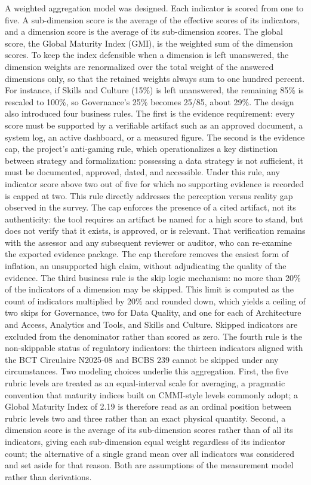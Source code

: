 A weighted aggregation model was designed. Each indicator is scored from one to five. A sub-dimension score is the average of the effective scores of its indicators, and a dimension score is the average of its sub-dimension scores. The global score, the Global Maturity Index (GMI), is the weighted sum of the dimension scores. To keep the index defensible when a dimension is left unanswered, the dimension weights are renormalized over the total weight of the answered dimensions only, so that the retained weights always sum to one hundred percent. For instance, if Skills and Culture (15\%) is left unanswered, the remaining 85\% is rescaled to 100\%, so Governance's 25\% becomes 25/85, about 29\%. The design also introduced four business rules. The first is the evidence requirement: every score must be supported by a verifiable artifact such as an approved document, a system log, an active dashboard, or a measured figure. The second is the evidence cap, the project's anti-gaming rule, which operationalizes a key distinction between strategy and formalization: possessing a data strategy is not sufficient, it must be documented, approved, dated, and accessible. Under this rule, any indicator score above two out of five for which no supporting evidence is recorded is capped at two. This rule directly addresses the perception versus reality gap observed in the survey. The cap enforces the presence of a cited artifact, not its authenticity: the tool requires an artifact be named for a high score to stand, but does not verify that it exists, is approved, or is relevant. That verification remains with the assessor and any subsequent reviewer or auditor, who can re-examine the exported evidence package. The cap therefore removes the easiest form of inflation, an unsupported high claim, without adjudicating the quality of the evidence. The third business rule is the skip logic mechanism: no more than 20\% of the indicators of a dimension may be skipped. This limit is computed as the count of indicators multiplied by 20\% and rounded down, which yields a ceiling of two skips for Governance, two for Data Quality, and one for each of Architecture and Access, Analytics and Tools, and Skills and Culture. Skipped indicators are excluded from the denominator rather than scored as zero. The fourth rule is the non-skippable status of regulatory indicators: the thirteen indicators aligned with the BCT Circulaire N\textdegree{}2025-08 and BCBS 239 cannot be skipped under any circumstances. Two modeling choices underlie this aggregation. First, the five rubric levels are treated as an equal-interval scale for averaging, a pragmatic convention that maturity indices built on CMMI-style levels commonly adopt; a Global Maturity Index of 2.19 is therefore read as an ordinal position between rubric levels two and three rather than an exact physical quantity. Second, a dimension score is the average of its sub-dimension scores rather than of all its indicators, giving each sub-dimension equal weight regardless of its indicator count; the alternative of a single grand mean over all indicators was considered and set aside for that reason. Both are assumptions of the measurement model rather than derivations.

